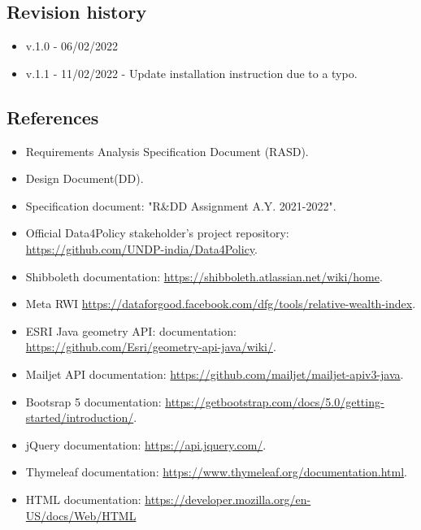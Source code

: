\subsection{Revision history}
\begin{itemize}
    \item v.1.0 - 06/02/2022
    \item v.1.1 - 11/02/2022 - Update installation instruction due to a typo.
\end{itemize}

\subsection{References}
\begin{itemize}
    \item Requirements Analysis Specification Document (RASD).
    \item Design Document(DD).
    \item Specification document: "R\&DD Assignment A.Y. 2021-2022".
    \item Official Data4Policy stakeholder's project repository: \href{https://github.com/UNDP-india/Data4Policy}{https://github.com/UNDP-india/Data4Policy}.
    \item Shibboleth documentation: \href{https://shibboleth.atlassian.net/wiki/home}{https://shibboleth.atlassian.net/wiki/home}.
    \item Meta RWI \href{https://dataforgood.facebook.com/dfg/tools/relative-wealth-index}{https://dataforgood.facebook.com/dfg/tools/relative-wealth-index}.
    \item ESRI Java geometry API: documentation: \href{https://github.com/Esri/geometry-api-java/wiki/}{https://github.com/Esri/geometry-api-java/wiki/}.
    \item Mailjet API documentation:  \href{https://github.com/mailjet/mailjet-apiv3-java}{https://github.com/mailjet/mailjet-apiv3-java}.
    \item Bootsrap 5 documentation:  \href{https://getbootstrap.com/docs/5.0/getting-started/introduction/}{https://getbootstrap.com/docs/5.0/getting-started/introduction/}.
    \item jQuery documentation:  \href{https://api.jquery.com/}{https://api.jquery.com/}.
    \item Thymeleaf documentation: \href{https://www.thymeleaf.org/documentation.html}{https://www.thymeleaf.org/documentation.html}.
    \item HTML documentation: \href{https://developer.mozilla.org/en-US/docs/Web/HTML}{https://developer.mozilla.org/en-US/docs/Web/HTML}

\end{itemize}
